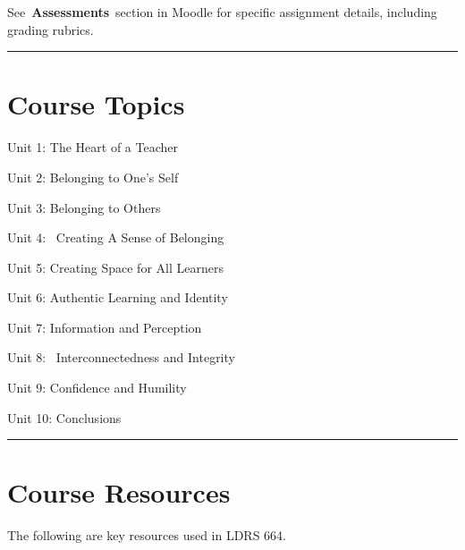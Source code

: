 \documentclass[
]{book}
\begin{document}
See~\textbf{Assessments}~section in Moodle for specific assignment details, including
grading rubrics.

\begin{center}\rule{0.5\linewidth}{0.5pt}\end{center}

\hypertarget{course-topics}{%
\section*{Course Topics}\label{course-topics}}

Unit 1: The Heart of a Teacher

Unit 2: Belonging to One's Self

Unit 3: Belonging to Others

Unit 4: ~Creating A Sense of Belonging

Unit 5: Creating Space for All Learners

Unit 6: Authentic Learning and Identity

Unit 7: Information and Perception

Unit 8: ~Interconnectedness and Integrity

Unit 9: Confidence and Humility

Unit 10: Conclusions

\begin{center}\rule{0.5\linewidth}{0.5pt}\end{center}

\hypertarget{course-resources}{%
\section*{Course Resources}\label{course-resources}}

The following are key resources used in LDRS 664.
\end{document}
